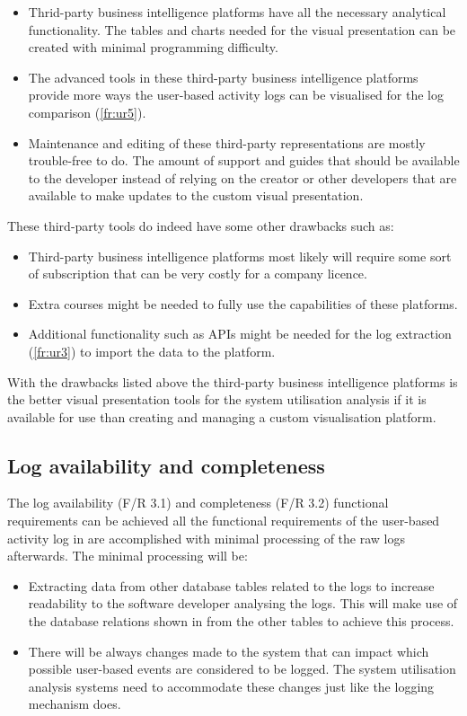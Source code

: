 \begin{itemize}
	\item Thrid-party business intelligence platforms have all the necessary analytical functionality. The tables and charts needed for the visual presentation can be created with minimal programming difficulty.
	\item The advanced tools in these third-party business intelligence platforms provide more ways the user-based activity logs can be visualised for the log comparison (\ref{fr:ur5}).
	\item Maintenance and editing of these third-party representations are mostly trouble-free to do. The amount of support and guides that should be available to the developer instead of relying on the creator or other developers that are available to make updates to the custom visual presentation.
\end{itemize}

These third-party tools do indeed have some other drawbacks such as:

\begin{itemize}
	\item Third-party business intelligence platforms most likely will require some sort of subscription that can be very costly for a company licence.
	\item Extra courses might be needed to fully use the capabilities of these platforms.
	\item Additional functionality such as APIs might be needed for the log extraction (\ref{fr:ur3}) to import the data to the platform.
\end{itemize}

With the drawbacks listed above the third-party business intelligence platforms is the better visual presentation tools for the system utilisation analysis if it is available for use than creating and managing a custom visualisation platform.

\subsection{Log availability and completeness}\label{sec:ch2_log_Availability}
The log availability (F/R 3.1) and completeness (F/R 3.2) functional requirements can be achieved all the functional requirements of the user-based activity log in  are accomplished with minimal processing of the raw logs afterwards. The minimal processing will be:

\begin{itemize}
	\item Extracting data from other database tables related to the logs to increase readability to the software developer analysing the logs. This will make use of the database relations shown in  from the other tables to achieve this process. 
	\item There will be always changes made to the system that can impact which possible user-based events are considered to be logged. The system utilisation analysis systems need to accommodate these changes just like the logging mechanism does. 
\end{itemize}

